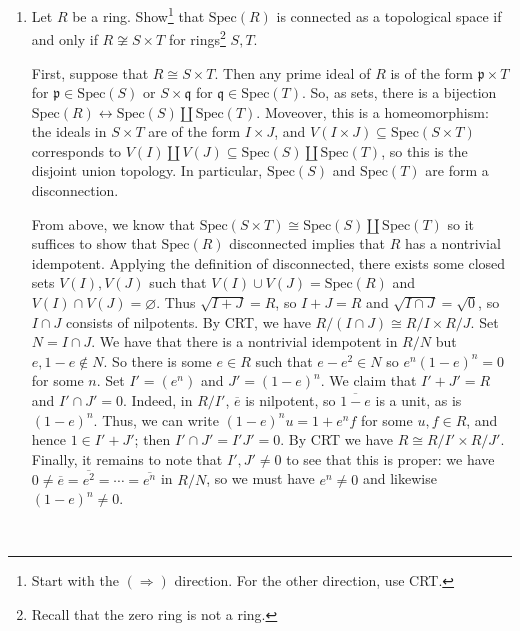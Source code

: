 \documentclass[12pt]{amsart}
\newcommand{\p}{\mathfrak{p}}
\newcommand{\q}{\mathfrak{q}}
\newcommand{\Spec}{\mathrm{Spec}}
\newcommand{\1}{\mathbbm{1}}
\newcommand{\solution}[1]{\ifthenelse {\equal{\displaysol}{1}} {\begin{framed}{\color{meretale}\noindent #1}\end{framed}} { \ }}
\newcommand\itemB{\stepcounter{enumi}\item[(\theenumi)]}
\begin{document}
\begin{enumerate}
\itemB Let $R$ be a ring. Show\footnote{Start with the $(\Rightarrow)$ direction. For the other direction, use CRT.} that $\Spec(R)$ is connected as a topological space if and only if  $R\not\cong S \times T$ for rings\footnote{Recall that the zero ring is not a ring.} $S,T$.

\solution{First, suppose that $R\cong S\times T$. Then any prime ideal of $R$ is of the form $\p \times T$ for $\p\in \Spec(S)$ or $S\times \q$ for $\q\in\Spec(T)$. So, as sets, there is a bijection $\Spec(R) \leftrightarrow \Spec(S) \coprod \Spec(T)$. Moveover, this is a homeomorphism: the ideals in $S\times T$ are of the form $I\times J$, and $V(I\times J) \subseteq \Spec(S \times T)$ corresponds to $V(I) \coprod V(J) \subseteq \Spec(S) \coprod \Spec(T)$, so this is the disjoint union topology. In particular, $\Spec(S)$ and $\Spec(T)$ are form a disconnection.

From above, we know that $\Spec(S \times T) \cong \Spec(S) \coprod \Spec(T)$ so it suffices to show that $\Spec(R)$ disconnected implies that $R$ has a nontrivial idempotent. Applying the definition of disconnected, there exists some closed sets $V(I), V(J)$ such that $V(I) \cup V(J) = \Spec(R)$ and $V(I) \cap V(J) = \varnothing$. Thus $\sqrt{I+J} = R$, so $I+J=R$ and $\sqrt{I\cap J}=\sqrt{0}$, so $I\cap J$ consists of nilpotents. By CRT, we have $R/(I\cap J) \cong R/I \times R/J$. Set $N=I\cap J$. We have that there is a nontrivial idempotent in $R/N$ but $e, 1-e \notin N$. So there is some $e\in R$ such that $e-e^2 \in N$ so $e^n(1-e)^n = 0$ for some $n$. Set $I' = (e^n)$ and $J'= (1-e)^n$. We claim that $I'+J' = R$ and $I'\cap J'=0$. Indeed, in $R/I'$, $\overline{e}$ is nilpotent, so $\overline{1-e}$ is a unit, as is $(1-e)^n$. Thus, we can write $(1-e)^n u = 1 + e^n f$ for some $u,f\in R$, and hence $1 \in I' + J'$; then $I' \cap J' = I'J' =0$. By CRT we have $R\cong R/I' \times R/J'$. Finally, it remains to note that $I',J'\neq 0$ to see that this is proper: we have $0\neq \overline{e} =  \overline{e^2} = \cdots = \overline{e^n}$ in $R/N$, so we must have $e^n \neq 0$ and likewise $(1-e)^n \neq 0$.
}


\end{enumerate}
\vfill
\end{document}
